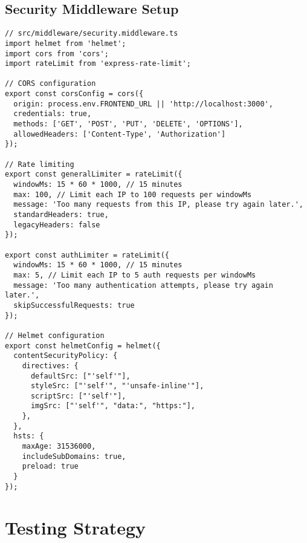 \documentclass[12pt,a4paper]{article}
\begin{document}
\subsection{Security Middleware Setup}
\begin{lstlisting}[caption=Security Configuration]
// src/middleware/security.middleware.ts
import helmet from 'helmet';
import cors from 'cors';
import rateLimit from 'express-rate-limit';

// CORS configuration
export const corsConfig = cors({
  origin: process.env.FRONTEND_URL || 'http://localhost:3000',
  credentials: true,
  methods: ['GET', 'POST', 'PUT', 'DELETE', 'OPTIONS'],
  allowedHeaders: ['Content-Type', 'Authorization']
});

// Rate limiting
export const generalLimiter = rateLimit({
  windowMs: 15 * 60 * 1000, // 15 minutes
  max: 100, // Limit each IP to 100 requests per windowMs
  message: 'Too many requests from this IP, please try again later.',
  standardHeaders: true,
  legacyHeaders: false
});

export const authLimiter = rateLimit({
  windowMs: 15 * 60 * 1000, // 15 minutes
  max: 5, // Limit each IP to 5 auth requests per windowMs
  message: 'Too many authentication attempts, please try again later.',
  skipSuccessfulRequests: true
});

// Helmet configuration
export const helmetConfig = helmet({
  contentSecurityPolicy: {
    directives: {
      defaultSrc: ["'self'"],
      styleSrc: ["'self'", "'unsafe-inline'"],
      scriptSrc: ["'self'"],
      imgSrc: ["'self'", "data:", "https:"],
    },
  },
  hsts: {
    maxAge: 31536000,
    includeSubDomains: true,
    preload: true
  }
});
\end{lstlisting}

\section{Testing Strategy}
\end{document}
